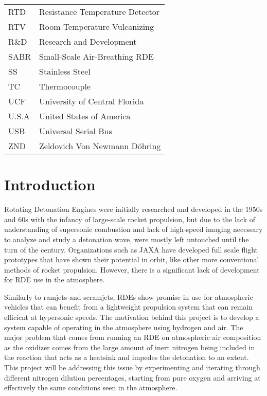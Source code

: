 \begin{center}
\begin{tabular}{l l}
        RTD & Resistance Temperature Detector \\
        RTV & Room-Temperature Vulcanizing \\
        R\&D & Research and Development \\
        SABR & Small-Scale Air-Breathing RDE \\
        SS & Stainless Steel \\
        TC & Thermocouple \\
        UCF & University of Central Florida \\
        U.S.A & United States of America \\
        USB & Universal Serial Bus \\
        ZND & Zeldovich Von Newmann D\"{o}hring \\
    \end{tabular}
\end{center}

\newpage

\section{Introduction}
\doublespacing

Rotating Detonation Engines were initially researched and developed in the 1950s and 60s with the infancy of large-scale rocket propulsion, but due to the lack of understanding of supersonic combustion and lack of high-speed imaging necessary to analyze and study a detonation wave, were mostly left untouched until the turn of the century. Organizations such as JAXA have developed full scale flight prototypes that have shown their potential in orbit, like other more conventional methods of rocket propulsion. However, there is a significant lack of development for RDE use in the atmosphere.

Similarly to ramjets and scramjets, RDEs show promise in use for atmospheric vehicles that can benefit from a lightweight propulsion system that can remain efficient at hypersonic speeds. The motivation behind this project is to develop a system capable of operating in the atmosphere using hydrogen and air. The major problem that comes from running an RDE on atmospheric air composition as the oxidizer comes from the large amount of inert nitrogen being included in the reaction that acts as a heatsink and impedes the detonation to an extent. This project will be addressing this issue by experimenting and iterating through different nitrogen dilution percentages, starting from pure oxygen and arriving at effectively the same conditions seen in the atmosphere.

